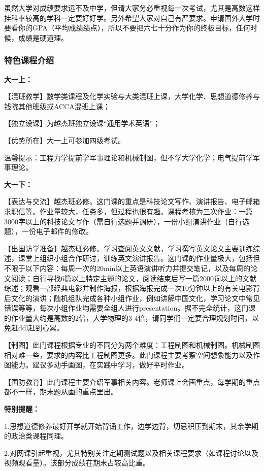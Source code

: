 \documentclass[
decoration,  %
]{qyxf-book}
\begin{document}
虽然大学对成绩要求远不及中学，但请大家务必重视每一次考试，尤其是高数这样挂科率较高的学科一定要好好学。另外希望大家对自己有严要求。申请国外大学时要看你的GPA（平均成绩绩点），所以不要把六七十分作为你的终极目标，任何时候，成绩是硬道理。

\subsubsection{特色课程介绍}
\textbf{大一上：}

【混班教学】数学类课程及化学实验与大类混班上课，大学化学、思想道德修养与钱院其他班级或ACCA混班上课；

【独立设课】为越杰班独立设课“通用学术英语”；

【优势所在】大一上可参加四级考试。

温馨提示：工程力学提前学军事理论和机械制图，但不学大学化学；电气提前学军事理论。

\textbf{大一下：}

【表达与交流】越杰班必修。这门课的重点是科技论文写作、演讲报告、电子邮箱求职信等。作业量较大，任务多，但过程也很有趣。课程考核为三次作业：一篇3000字以上的科技论文写作（需自行选题并调研），一份小组演讲作业（自行选题），一份电子邮件的修改。

【出国访学准备】越杰班必修。学习查阅英文文献，学习撰写英文论文主要训练综述，课堂上组织小组合作研讨，训练英文演讲报告。这门课的作业量极大，包括但不限于以下内容：每周一次的20min以上英语演讲听力并提交笔记，以及每周的论文阅读；自行寻找6篇以上特定主题的论文，阅读结束后写一篇2000词以上的文献综述；观看一部经典电影并制作海报，根据海报完成一次10分钟以上的有关电影背后文化的演讲；随机组队完成各种小组作业，例如讲解中国文化，学习论文中常见错误等等，每次小组作业均需要全组人进行presentation。据不完全统计，这门课的作业量大约是高数的2倍，大学物理的3-4倍，请同学们一定要合理规划时间，以免赶ddl赶到心累。

【制图】此门课程根据专业的不同分为两个难度：工程制图和机械制图。机械制图相对难一些，要求的内容比工程制图更多。此门课程主要考察空间想象能力以及作图能力。建议多动手画图，在实践中学习，做好平时作业。

【国防教育】此门课程主要介绍军事相关内容。老师课上会画重点，每学期的重点都不一样，期末题从画的重点里出。

\textbf{特别提醒：}

1.思想道德修养最好开学就开始背诵工作，边学边背，切忌积压到期末，其余学期的政治类课程同理。

2.对网课引起重视，尤其特别关注定期测试题以及相关课程要求（如课程讨论以及视频观看量）。该部分成绩在期末占较高比重。
\end{document}
